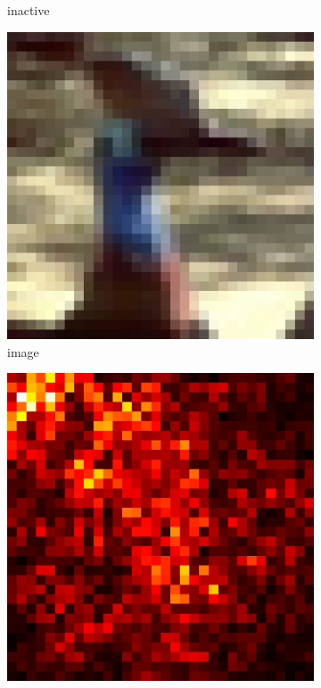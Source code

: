 \documentclass[preprint,12pt]{elsarticle}
\begin{document}
\begin{figure}
\begin{subfigure}{0.14\textwidth}
        \caption{inactive}
    \end{subfigure}
    \hfill
    \begin{subfigure}{0.14\linewidth}
        \centering
        \includegraphics[width=\linewidth]{../visualizations/examples/cifar10/resnet18/images/2.png}
        \caption{image}
    \end{subfigure}
    \hfill
    \begin{subfigure}{0.14\linewidth}
        \centering
        \includegraphics[width=\linewidth]{../visualizations/examples/cifar10/resnet18/saliency_map/2.png}

\end{subfigure}
\end{figure}
\end{document}
